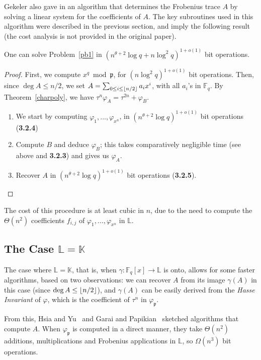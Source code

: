 \documentclass[sigconf]{acmart}
\newcommand{\K}{\mathbb{K}}
\newcommand{\F}{\mathbb{F}}
\renewcommand{\L}{\mathbb{L}}
\newcommand{\frakp}{\mathfrak{p}}
\DeclarePairedDelimiter\floor{\lfloor}{\rfloor}
\begin{document}
Gekeler also gave in \cite[Section~3]{frobdist} an algorithm that
determines the Frobenius trace $A$ by solving a linear system for the
coefficients of $A$. The key subroutines used in this algorithm were
described in the previous section, and imply the following result (the
cost analysis is not provided in the original paper).
\begin{proposition}\label{prop:gek}
  One can solve Problem~\ref{pb1} in $(n^{\theta+2}\log
  q + n \log^2 q)^{1+o(1)}$ bit operations.
\end{proposition}
\begin{proof}
First, we compute $x^q\bmod \frakp$, for $(n \log^2 q)^{1+o(1)}$ bit
operations. Then, since $\deg A \leq{n}/{2}$, we set $A = \sum_{0
  \le i \leq \floor*{n/2}} a_i x^i$, with all $a_i$'s in $\F_q$. By
Theorem~\ref{charpoly}, we have $\tau^n \varphi_A = \tau^{2n} +
\varphi_B.$
\begin{enumerate}
\item We start by computing $\varphi_1,\dots,\varphi_{x^n}$, in
$(n^{\theta+2} \log q)^{1+o(1)}$ bit operations ({\bf 3.2.4})
\item Compute $B$ and deduce $\varphi_B$; this takes comparatively
negligible time (see above and {\bf 3.2.3}) and gives us $\varphi_A$.
\item Recover $A$ in $(n^{\theta+2} \log q)^{1+o(1)}$
bit operations ({\bf 3.2.5}). \qedhere
\end{enumerate}
\end{proof}
The cost of this procedure is at least cubic in $n$, due to the need
to compute the $\Theta(n^2)$ coefficients $f_{i,j}$ of
$\varphi_1,\dots,\varphi_{x^n}$ in $\L$.


\subsection{The Case $\L = \K$}

The case where $\L = \K$, that is, when $\gamma: \F_q[x] \to \L$ is
onto, allows for some faster algorithms, based on two observations:
we can recover $A$ from its image $\gamma(A)$ in this case (since
 $\deg A \le \floor*{n/2}$), and $\gamma(A)$ can be easily
derived from the {\em Hasse Invariant} of $\varphi$, which is the
coefficient of $\tau^{n}$ in $\varphi_{\frakp}$.

From this, Hsia and Yu~\cite{HsYu00} and Garai and
Papikian~\cite{GaPa18} sketched algorithms that compute $A$.  When
$\varphi_{\frakp}$ is computed in a direct manner, they take
$\Theta(n^2)$ additions, multiplications and Frobenius applications in
$\L$, so $\Omega(n^3)$ bit operations.
\end{document}
